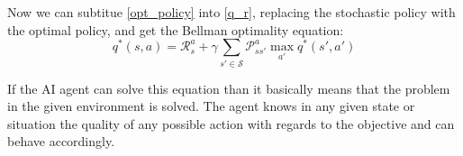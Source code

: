 \documentclass[10pt,a4paper,draft]{article}
\begin{document}
Now we can subtitue \eqref{opt_policy} into \eqref{q_r}, replacing the stochastic policy with the optimal policy, and get the Bellman optimality equation:
\begin{equation}
q^*(s,a) = \mathcal{R}_s^a + \gamma\sum_{s' \in \mathcal{S}} \mathcal{P}_{ss'}^a \max_{a'} q^*(s',a')
\label{bellman_opt_q_eq}
\end{equation}

If the AI agent can solve this equation than it basically means that the problem in the given environment is solved. The agent knows in any given state or situation the quality of any possible action with regards to the objective and can behave accordingly.



\end{document}
